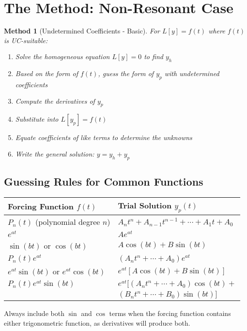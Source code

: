 \documentclass[12pt]{article}
\newtheorem{method}{Method}
\begin{document}
\section{The Method: Non-Resonant Case}

\begin{method}[Undetermined Coefficients - Basic]
For $L[y] = f(t)$ where $f(t)$ is UC-suitable:
\begin{enumerate}
    \item Solve the homogeneous equation $L[y] = 0$ to find $y_h$
    \item Based on the form of $f(t)$, guess the form of $y_p$ with undetermined coefficients
    \item Compute the derivatives of $y_p$
    \item Substitute into $L[y_p] = f(t)$
    \item Equate coefficients of like terms to determine the unknowns
    \item Write the general solution: $y = y_h + y_p$
\end{enumerate}
\end{method}

\subsection{Guessing Rules for Common Functions}

\begin{center}
\begin{tabular}{|l|l|}
\hline
\textbf{Forcing Function $f(t)$} & \textbf{Trial Solution $y_p(t)$} \\
\hline
$P_n(t)$ (polynomial degree $n$) & $A_n t^n + A_{n-1}t^{n-1} + \cdots + A_1 t + A_0$ \\
\hline
$e^{at}$ & $Ae^{at}$ \\
\hline
$\sin(bt)$ or $\cos(bt)$ & $A\cos(bt) + B\sin(bt)$ \\
\hline
$P_n(t) e^{at}$ & $(A_n t^n + \cdots + A_0)e^{at}$ \\
\hline
$e^{at}\sin(bt)$ or $e^{at}\cos(bt)$ & $e^{at}[A\cos(bt) + B\sin(bt)]$ \\
\hline
$P_n(t) e^{at} \sin(bt)$ & $e^{at}[(A_n t^n + \cdots + A_0)\cos(bt) +$ \\
& $(B_n t^n + \cdots + B_0)\sin(bt)]$ \\
\hline
\end{tabular}
\end{center}

\begin{warning}
Always include both $\sin$ and $\cos$ terms when the forcing function contains either trigonometric function, as derivatives will produce both.
\end{warning}
\end{document}

